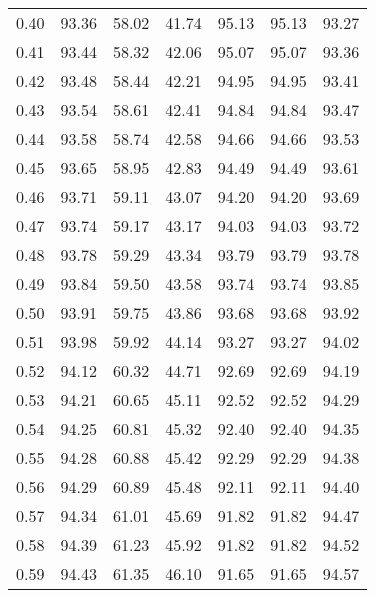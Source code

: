 \begin{tabular}{|c|c|c|c|c|c|c|}
      0.40 &     93.36 &     58.02 &      41.74 &   95.13 &      95.13 &         93.27 \\
      0.41 &     93.44 &     58.32 &      42.06 &   95.07 &      95.07 &         93.36 \\
      0.42 &     93.48 &     58.44 &      42.21 &   94.95 &      94.95 &         93.41 \\
      0.43 &     93.54 &     58.61 &      42.41 &   94.84 &      94.84 &         93.47 \\
      0.44 &     93.58 &     58.74 &      42.58 &   94.66 &      94.66 &         93.53 \\
      0.45 &     93.65 &     58.95 &      42.83 &   94.49 &      94.49 &         93.61 \\
      0.46 &     93.71 &     59.11 &      43.07 &   94.20 &      94.20 &         93.69 \\
      0.47 &     93.74 &     59.17 &      43.17 &   94.03 &      94.03 &         93.72 \\
      0.48 &     93.78 &     59.29 &      43.34 &   93.79 &      93.79 &         93.78 \\
      0.49 &     93.84 &     59.50 &      43.58 &   93.74 &      93.74 &         93.85 \\
      0.50 &     93.91 &     59.75 &      43.86 &   93.68 &      93.68 &         93.92 \\
      0.51 &     93.98 &     59.92 &      44.14 &   93.27 &      93.27 &         94.02 \\
      0.52 &     94.12 &     60.32 &      44.71 &   92.69 &      92.69 &         94.19 \\
      0.53 &     94.21 &     60.65 &      45.11 &   92.52 &      92.52 &         94.29 \\
      0.54 &     94.25 &     60.81 &      45.32 &   92.40 &      92.40 &         94.35 \\
      0.55 &     94.28 &     60.88 &      45.42 &   92.29 &      92.29 &         94.38 \\
      0.56 &     94.29 &     60.89 &      45.48 &   92.11 &      92.11 &         94.40 \\
      0.57 &     94.34 &     61.01 &      45.69 &   91.82 &      91.82 &         94.47 \\
      0.58 &     94.39 &     61.23 &      45.92 &   91.82 &      91.82 &         94.52 \\
      0.59 &     94.43 &     61.35 &      46.10 &   91.65 &      91.65 &         94.57 \\

\end{tabular}
